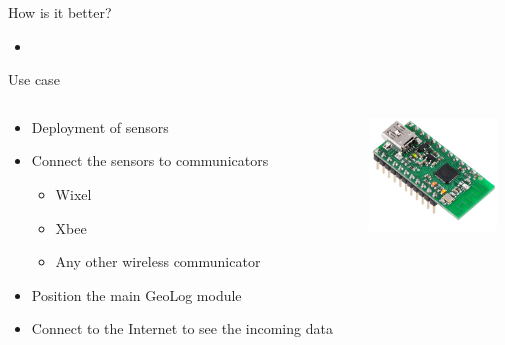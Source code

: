 \documentclass{beamer}
\begin{document}
\begin{frame}{How is it better?}
\begin{itemize}
\item 
\end{itemize}
\end{frame}

\begin{frame}{Use case}
\begin{columns}[T] %
     \begin{column}[T]{7cm} %
		\begin{itemize}
		\item Deployment of sensors
		\item Connect the sensors to communicators
			\begin{itemize}
			\item Wixel
			\item Xbee
			\item Any other wireless communicator
			\end{itemize}
		\item Position the main GeoLog module
		\item Connect to the Internet to see the incoming data
		\end{itemize}
	\end{column}
     \begin{column}[T]{3cm} %
          \includegraphics[height=3cm]{graphics/wixel.png}
          \cite{wixel}
     \end{column}
     \end{columns}
\end{frame}
\end{document}
